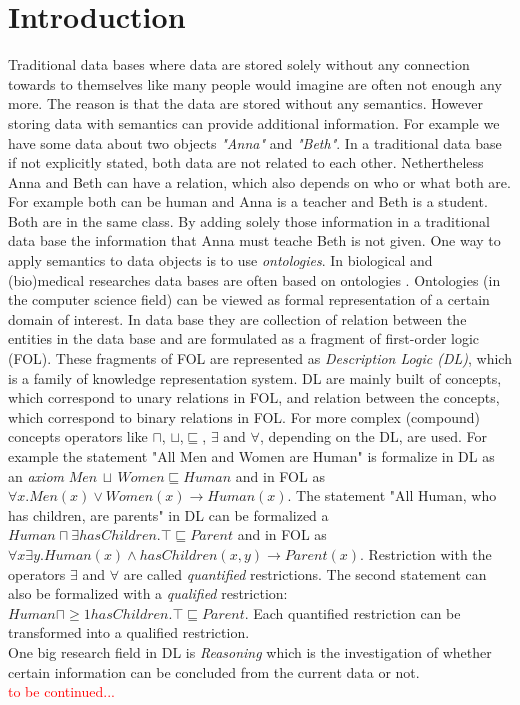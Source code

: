 \documentclass[a4paper,11pt]{scrartcl}
\theoremstyle{break}
\theoremstyle{definition}
\begin{document}
\section{Introduction}
Traditional data bases where data are stored solely without any connection towards to themselves like many people would imagine are often not enough any more. The reason is that the data are stored without any semantics. However storing data with semantics can provide additional information. For example we have some data about two objects \textit{"Anna"} and \textit{"Beth"}. In a traditional data base if not explicitly stated, both data are not related to each other. Nethertheless Anna and Beth can have a relation, which also depends on who or what both are. For example both can be human and Anna is a teacher and Beth is a student. Both are in the same class. By adding solely those information in a traditional data base the information that Anna must teache Beth is not given. One way to apply semantics to data objects is to use \textit{ontologies}. In biological and (bio)medical researches data bases are often based on ontologies \cite{bio}. Ontologies (in the computer science field) can be viewed as formal representation of a certain domain of interest. In data base they are collection of relation between the entities in the data base and are formulated as a fragment of first-order logic (FOL). These fragments of FOL are represented as \textit{Description Logic (DL)}, which is a family of knowledge representation system. DL are mainly built of concepts, which correspond to unary relations in FOL, and relation between the concepts, which correspond to binary relations in FOL. For more complex (compound) concepts operators like $\sqcap$, $\sqcup$,$\sqsubseteq$, $\exists$ and $\forall$, depending on the DL, are used. For example the statement "All Men and Women are Human" is formalize in DL as an \textit{axiom} $Men\,\sqcup\, Women\sqsubseteq Human$ and in FOL as $\forall x.Men(x)\vee Women(x)\rightarrow Human(x)$. The statement "All Human, who has children, are parents" in DL can be formalized a $Human\sqcap \exists hasChildren.\top \sqsubseteq Parent$ and in FOL as $\forall x \exists y. Human(x)\wedge hasChildren(x,y)\rightarrow Parent(x)$. Restriction with the operators $\exists$ and $\forall$ are called \textit{quantified} restrictions. The second statement can also be formalized with a \textit{qualified} restriction: $Human\sqcap \geq 1 hasChildren.\top\sqsubseteq Parent$. Each quantified restriction can be transformed into a qualified restriction.\\
One big research field in DL is \textit{Reasoning} which is the investigation of whether certain information can be concluded from the current data or not.\\
\textcolor{red}{to be continued...}
\end{document}
